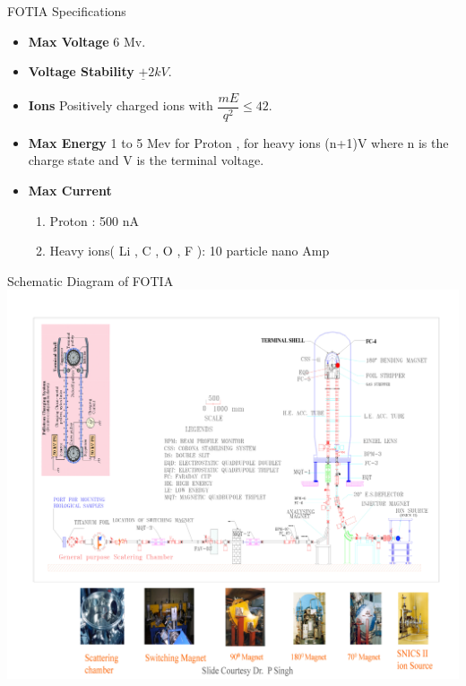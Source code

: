 \documentclass[11pt]{beamer}
\begin{document}
\begin{frame}{FOTIA Specifications}

  \begin{itemize}
   
    \item \textbf{Max Voltage} 6 Mv.
    \item \textbf{Voltage Stability} $\underline{+} 2 kV $.
    \item \textbf{Ions} Positively charged ions with $\dfrac{mE}{q^2}   \leqslant 42$.
    \item \textbf{Max Energy} 1 to 5 Mev for Proton , for heavy ions (n+1)V where n is the charge state and V is the terminal voltage.
    \item \textbf{Max Current} 
    \begin{enumerate}
     \item Proton : 500 nA
     \item Heavy ions( Li , C , O , F ): 10 particle nano Amp
    \end{enumerate}
    
    
   \end{itemize}

\end{frame}

\begin{frame}{Schematic Diagram of FOTIA}
\includegraphics[width=\linewidth]{FOTIA_Page_05.jpg}
\end{frame}
\end{document}
